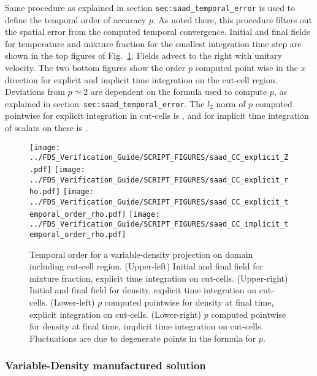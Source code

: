 \documentclass[12pt]{article}
\begin{document}
Same procedure as explained in section  \texttt{sec:saad\_temporal\_error} is used to define the temporal order of accuracy $p$. As noted there, this procedure filters out the spatial error from the computed temporal convergence. Initial and final fields for temperature and mixture fraction for the smallest integration time step are shown in the top figures of Fig.~\ref{fig:saad_cc_temporal_order}. Fields advect to the right with unitary velocity. The two bottom figures show the order $p$ computed point wise in the $x$ direction for explicit and implicit time integration on the cut-cell region. Deviations from $p \simeq 2$ are dependent on the formula used to compute $p$, as explained in section~\texttt{sec:saad\_temporal\_error}. 
The $l_2$ norm of $p$ computed pointwise for explicit integration in cut-cells is \!, and for implicit time integration of scalars on these is  \!. 

\begin{figure}[ht]
\centering
\texttt{[image: ../FDS\_Verification\_Guide/SCRIPT\_FIGURES/saad\_CC\_explicit\_Z.pdf]}
\texttt{[image: ../FDS\_Verification\_Guide/SCRIPT\_FIGURES/saad\_CC\_explicit\_rho.pdf]}
\texttt{[image: ../FDS\_Verification\_Guide/SCRIPT\_FIGURES/saad\_CC\_explicit\_temporal\_order\_rho.pdf]}
\texttt{[image: ../FDS\_Verification\_Guide/SCRIPT\_FIGURES/saad\_CC\_implicit\_temporal\_order\_rho.pdf]}
\caption[The {\ct saad CC} temporal order test case]{Temporal order for a variable-density projection on domain including cut-cell region.  (Upper-left) Initial and final field for mixture fraction, explicit time integration on cut-cells.  (Upper-right) Initial and final field for density, explicit time integration on cut-cells.  (Lower-left) $p$ computed pointwise for density at final time, explicit integration on cut-cells. (Lower-right) $p$ computed pointwise for density at final time, implicit time integration on cut-cells.  Fluctuations are due to degenerate points in the formula for $p$.}\label{fig:saad_cc_temporal_order}
\end{figure}


\subsubsection{Variable-Density manufactured solution}
\end{document}
